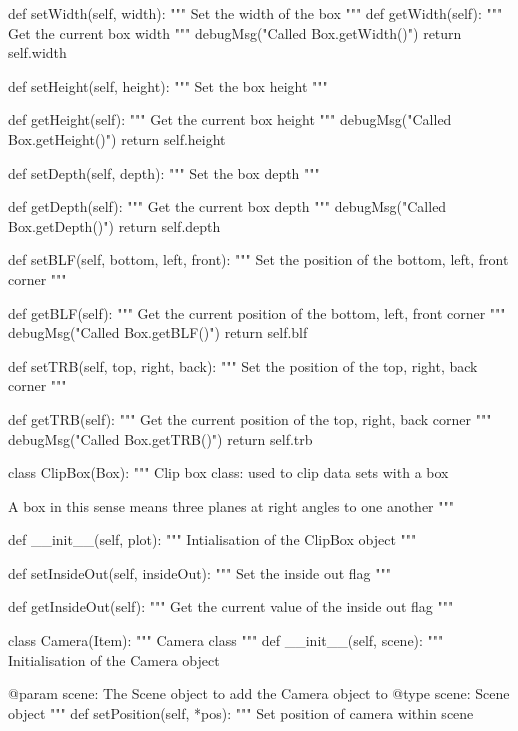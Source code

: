 \begin{python}
\begin{python}
\begin{verbose}
    def setWidth(self, width):
        """
        Set the width of the box
        """
    def getWidth(self):
        """
        Get the current box width
        """
        debugMsg("Called Box.getWidth()")
        return self.width

    def setHeight(self, height):
        """
        Set the box height
        """

    def getHeight(self):
        """
        Get the current box height
        """
        debugMsg("Called Box.getHeight()")
        return self.height

    def setDepth(self, depth):
        """
        Set the box depth
        """

    def getDepth(self):
        """
        Get the current box depth
        """
        debugMsg("Called Box.getDepth()")
        return self.depth

    def setBLF(self, bottom, left, front):
        """
        Set the position of the bottom, left, front corner
        """

    def getBLF(self):
        """
        Get the current position of the bottom, left, front corner
        """
        debugMsg("Called Box.getBLF()")
        return self.blf

    def setTRB(self, top, right, back):
        """
        Set the position of the top, right, back corner
        """

    def getTRB(self):
        """
        Get the current position of the top, right, back corner
        """
        debugMsg("Called Box.getTRB()")
        return self.trb


class ClipBox(Box):
    """
    Clip box class: used to clip data sets with a box

    A box in this sense means three planes at right angles to one another
    """

    def __init__(self, plot):
        """
        Intialisation of the ClipBox object
        """

    def setInsideOut(self, insideOut):
        """
        Set the inside out flag
        """

    def getInsideOut(self):
        """
        Get the current value of the inside out flag
        """

class Camera(Item):
    """
    Camera class
    """
    def __init__(self, scene):
        """
        Initialisation of the Camera object

        @param scene: The Scene object to add the Camera object to
        @type scene: Scene object
        """
    def setPosition(self, *pos):
        """
        Set position of camera within scene


\end{verbose}
\end{python}
\end{python}
